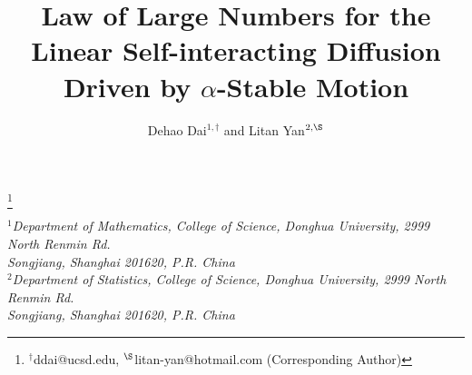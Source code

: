 \documentclass[11pt]{amsart}
\theoremstyle{plain}
\numberwithin{equation}{section}
\begin{document}
\title{Law of Large Numbers for the Linear Self-interacting Diffusion Driven by $\alpha$-Stable Motion}


\footnote[0]{${}^\dag$ddai@ucsd.edu, ${}^{\S}$litan-yan@hotmail.com (Corresponding Author)}

\date{}

\author[D. Dai and L. Yan]{Dehao Dai$^{1,\dag}$ and Litan Yan${}^{2,\S}$}


\maketitle

\begin{center}
{\footnotesize {\it {${}^1$Department of Mathematics, College of Science, Donghua University, 2999 North Renmin Rd.\\Songjiang, Shanghai 201620, P.R. China\\
${}^2$Department of Statistics, College of Science, Donghua University, 2999 North Renmin Rd.\\Songjiang, Shanghai 201620, P.R. China}}}
\end{center}

\maketitle

\end{document}
